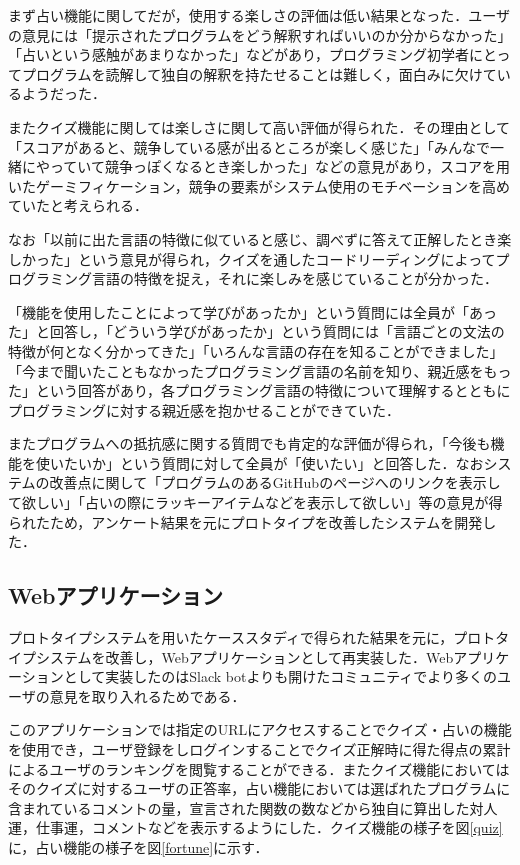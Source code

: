 まず占い機能に関してだが，使用する楽しさの評価は低い結果となった．ユーザの意見には「提示されたプログラムをどう解釈すればいいのか分からなかった」「占いという感触があまりなかった」などがあり，プログラミング初学者にとってプログラムを読解して独自の解釈を持たせることは難しく，面白みに欠けているようだった．

またクイズ機能に関しては楽しさに関して高い評価が得られた．その理由として「スコアがあると、競争している感が出るところが楽しく感じた」「みんなで一緒にやっていて競争っぽくなるとき楽しかった」などの意見があり，スコアを用いたゲーミフィケーション，競争の要素がシステム使用のモチベーションを高めていたと考えられる．

なお「以前に出た言語の特徴に似ていると感じ、調べずに答えて正解したとき楽しかった」という意見が得られ，クイズを通したコードリーディングによってプログラミング言語の特徴を捉え，それに楽しみを感じていることが分かった．

「機能を使用したことによって学びがあったか」という質問には全員が「あった」と回答し，「どういう学びがあったか」という質問には「言語ごとの文法の特徴が何となく分かってきた」「いろんな言語の存在を知ることができました」「今まで聞いたこともなかったプログラミング言語の名前を知り、親近感をもった」という回答があり，各プログラミング言語の特徴について理解するとともにプログラミングに対する親近感を抱かせることができていた．

またプログラムへの抵抗感に関する質問でも肯定的な評価が得られ，「今後も機能を使いたいか」という質問に対して全員が「使いたい」と回答した．なおシステムの改善点に関して「プログラムのあるGitHubのページへのリンクを表示して欲しい」「占いの際にラッキーアイテムなどを表示して欲しい」等の意見が得られたため，アンケート結果を元にプロトタイプを改善したシステムを開発した．

\subsection{Webアプリケーション}
プロトタイプシステムを用いたケーススタディで得られた結果を元に，プロトタイプシステムを改善し，Webアプリケーションとして再実装した．Webアプリケーションとして実装したのはSlack botよりも開けたコミュニティでより多くのユーザの意見を取り入れるためである．

このアプリケーションでは指定のURLにアクセスすることでクイズ・占いの機能を使用でき，ユーザ登録をしログインすることでクイズ正解時に得た得点の累計によるユーザのランキングを閲覧することができる．またクイズ機能においてはそのクイズに対するユーザの正答率，占い機能においては選ばれたプログラムに含まれているコメントの量，宣言された関数の数などから独自に算出した対人運，仕事運，コメントなどを表示するようにした．クイズ機能の様子を図\ref{quiz}に，占い機能の様子を図\ref{fortune}に示す．

